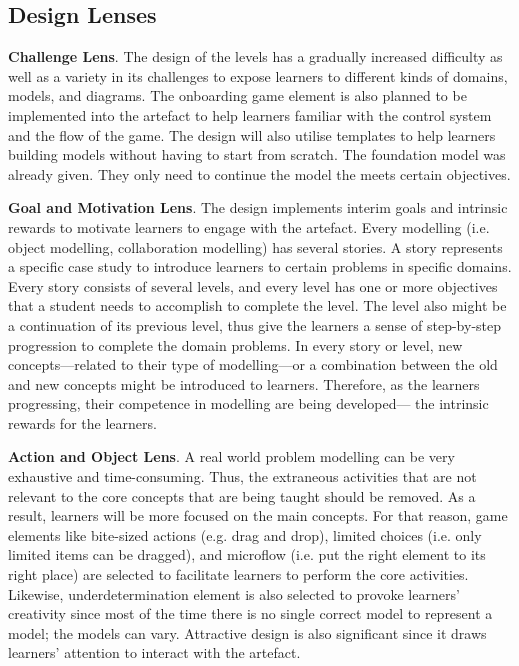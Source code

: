 \documentclass[runningheads,a4paper]{llncs}
\begin{document}
\subsection{Design Lenses}
\textbf{Challenge Lens}. The design of the levels has a gradually increased difficulty as well as a variety in its challenges to expose learners to different kinds of domains, models, and diagrams. The onboarding game element is also planned to be implemented into the artefact to help learners familiar with the control system and the flow of the game. The design will also utilise templates to help learners building models without having to start from scratch. The foundation model was already given. They only need to continue the model the meets certain objectives.

\textbf{Goal and Motivation Lens}. The design implements interim goals and intrinsic rewards to motivate learners to engage with the artefact. Every modelling (i.e. object modelling, collaboration modelling) has several stories. A story represents a specific case study to introduce learners to certain problems in specific domains. Every story consists of several levels, and every level has one or more objectives that a student needs to accomplish to complete the level. The level also might be a continuation of its previous level, thus give the learners a sense of step-by-step progression to complete the domain problems. In every story or level, new concepts---related to their type of modelling---or a combination between the old and new concepts might be introduced to learners. Therefore, as the learners progressing, their competence in modelling are being developed--- the intrinsic rewards for the learners. 

\textbf{Action and Object Lens}. A real world problem modelling can be very exhaustive and time-consuming. Thus, the extraneous activities that are not relevant to the core concepts that are being taught should be removed. As a result, learners will be more focused on the main concepts. For that reason, game elements like bite-sized actions (e.g. drag and drop), limited choices (i.e. only limited items can be dragged), and microflow (i.e. put the right element to its right place) are selected to facilitate learners to perform the core activities. Likewise, underdetermination element is also selected to provoke learners' creativity since most of the time there is no single correct model to represent a model; the models can vary. Attractive design is also significant since it draws learners' attention to interact with the artefact.
\end{document}
